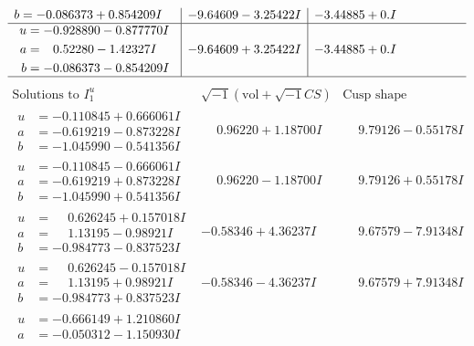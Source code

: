 \documentclass[1p]{elsarticle_modified}
\theoremstyle{definition}
\newcommand{\I}{\sqrt{-1}}
\begin{document}
$$\begin{array}{c|c|c}
\begin{aligned}
b &= -0.086373 + 0.854209 I\end{aligned}
 & -9.64609 - 3.25422 I & -3.44885 + 0. I\phantom{ +0.000000I} \\ \hline\begin{aligned}
u &= -0.928890 - 0.877770 I \\
a &= \phantom{-}0.52280 - 1.42327 I \\
b &= -0.086373 - 0.854209 I\end{aligned}
 & -9.64609 + 3.25422 I & -3.44885 + 0. I\phantom{ +0.000000I}\\
 \hline 
 \end{array}$$\newpage$$\begin{array}{c|c|c}  
\text{Solutions to }I^u_{1}& \I (\text{vol} + \sqrt{-1}CS) & \text{Cusp shape}\\
 \hline 
\begin{aligned}
u &= -0.110845 + 0.666061 I \\
a &= -0.619219 - 0.873228 I \\
b &= -1.045990 - 0.541356 I\end{aligned}
 & \phantom{-}0.96220 + 1.18700 I & \phantom{-}9.79126 - 0.55178 I \\ \hline\begin{aligned}
u &= -0.110845 - 0.666061 I \\
a &= -0.619219 + 0.873228 I \\
b &= -1.045990 + 0.541356 I\end{aligned}
 & \phantom{-}0.96220 - 1.18700 I & \phantom{-}9.79126 + 0.55178 I \\ \hline\begin{aligned}
u &= \phantom{-}0.626245 + 0.157018 I \\
a &= \phantom{-}1.13195 - 0.98921 I \\
b &= -0.984773 - 0.837523 I\end{aligned}
 & -0.58346 + 4.36237 I & \phantom{-}9.67579 - 7.91348 I \\ \hline\begin{aligned}
u &= \phantom{-}0.626245 - 0.157018 I \\
a &= \phantom{-}1.13195 + 0.98921 I \\
b &= -0.984773 + 0.837523 I\end{aligned}
 & -0.58346 - 4.36237 I & \phantom{-}9.67579 + 7.91348 I \\ \hline\begin{aligned}
u &= -0.666149 + 1.210860 I \\
a &= -0.050312 - 1.150930 I \\

\end{aligned}
\end{array}$$
\end{document}
